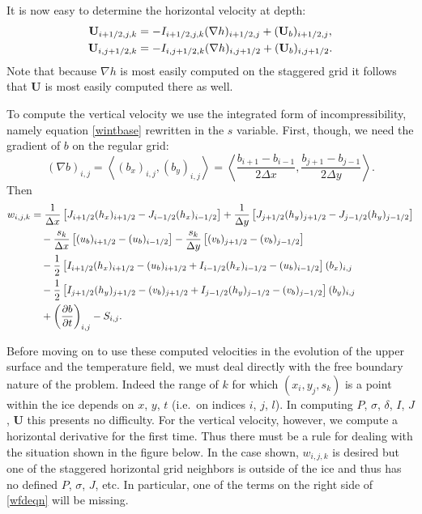 \documentclass{amsart}%
\theoremstyle{plain}
\theoremstyle{definition}
\theoremstyle{remark}
\newcommand{\ddt}[1]{\ensuremath{\frac{\partial #1}{\partial t}}}
\newcommand{\grad}{\nabla}
\newcommand{\ip}[2]{\ensuremath{\left<#1,#2\right>}}
\newcommand{\bU}{{\mathbf{U}}}
\begin{document}
It is now easy to determine the horizontal velocity at depth:
\begin{align}
\bU_{i+1/2,j,k} &= - I_{i+1/2,j,k} (\grad h)_{i+1/2,j} + (\bU_b)_{i+1/2,j}, \\
\bU_{i,j+1/2,k} &= - I_{i,j+1/2,k} (\grad h)_{i,j+1/2} + (\bU_b)_{i,j+1/2}. \notag
\end{align}
Note that because $\grad h$ is most easily computed on the staggered grid it follows that $\bU$ is most easily computed there as well.

To compute the vertical velocity we use the integrated form of incompressibility, namely equation \eqref{wintbase} rewritten in the $s$ variable.  First, though, we need the gradient of $b$ on the regular grid:
\begin{equation}(\grad b)_{i,j} = \ip{(b_x)_{i,j}}{(b_y)_{i,j}} = \ip{\frac{b_{i+1}-b_{i-1}}{2\Delta x}}{\frac{b_{j+1}-b_{j-1}}{2\Delta y}}.\end{equation}
Then
\begin{align}
w_{i,j,k} &= \frac{1}{\Delta x}\left[J_{i+1/2}(h_x)_{i+1/2}-J_{i-1/2} (h_x)_{i-1/2}\right] + \frac{1}{\Delta y}\left[J_{j+1/2}(h_y)_{j+1/2}-J_{j-1/2} (h_y)_{j-1/2}\right] \notag\\
    &\quad - \frac{s_k}{\Delta x}\left[(u_b)_{i+1/2}- (u_b)_{i-1/2}\right] - \frac{s_k}{\Delta y}\left[(v_b)_{j+1/2}- (v_b)_{j-1/2}\right] \notag\\
    &\quad -\frac{1}{2}\left[I_{i+1/2}(h_x)_{i+1/2}-(u_b)_{i+1/2} + I_{i-1/2}(h_x)_{i-1/2}-(u_b)_{i-1/2}\right](b_x)_{i,j} \notag\\
    &\quad -\frac{1}{2}\left[I_{j+1/2}(h_y)_{j+1/2}-(v_b)_{j+1/2} + I_{j-1/2}(h_y)_{j-1/2}-(v_b)_{j-1/2}\right](b_y)_{i,j} \notag\\
\label{wfdeqn}    &\quad + \left(\ddt{b}\right)_{i,j} - S_{i,j}.\end{align}

Before moving on to use these computed velocities in the evolution of the upper surface and the temperature field, we must deal directly with the free boundary nature of the problem.  Indeed the range of $k$ for which $(x_i,y_j,s_k)$ is a point within the ice depends on $x$, $y$, $t$ (i.e.~on indices $i$, $j$, $l$).  In computing $P$, $\sigma$, $\delta$, $I$, $J$, $\bU$ this presents no difficulty.  For the vertical velocity, however, we compute a horizontal derivative for the first time.  Thus there must be a rule for dealing with the situation shown in the figure below.  In the case shown, $w_{i,j,k}$ is desired but one of the staggered horizontal grid neighbors is outside of the ice and thus has no defined $P$, $\sigma$, $J$, etc.  In particular, one of the terms on the right side of \eqref{wfdeqn} will be missing.
\end{document}
